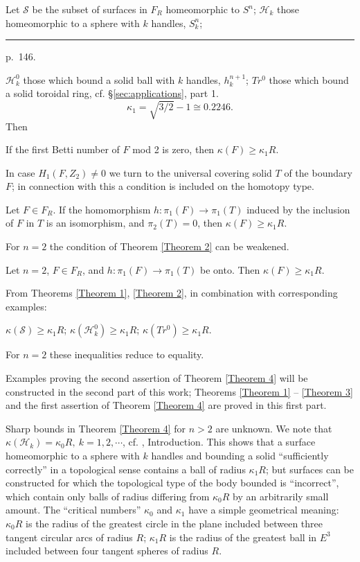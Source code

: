 \documentclass{amsart}
\theoremstyle{plain}
\theoremstyle{definition}
\begin{document}
Let $\mathcal{S}$ be the subset of surfaces in $F_R$ homeomorphic
to $S^n$; $\mathcal{H}_k$ those homeomorphic to a sphere with $k$
handles, $S^n_k$;

\medskip
\hrule\smallskip
\noindent p.~146.
\medskip

$\mathcal{H}^0_k$ those which bound a solid ball with $k$ handles,
$h^{n+1}_k$; $Tr^0$ those which bound a solid toroidal ring, cf.
\S \ref{sec:applications}, part 1.
$$\kappa_1 = \sqrt{3/2} -1 \cong 0.2246.$$
Then
\begin{thm} \label{Theorem 1} If the first Betti number of $F$ mod 2 is
zero, then $\kappa(F) \ge \kappa_1R$.
\end{thm}
In case $H_1(F,Z_2) \ne 0$ we turn to the universal covering
solid $T$ of the boundary $F$; in connection with this a condition
is included on the homotopy type.
\begin{thm}\label{Theorem 2} Let $F \in F_R$. If the homomorphism
$h: \pi_1(F) \to \pi_1(T)$ induced by the inclusion of $F$ in
$T$ is an isomorphism, and $\pi_2(T) = 0$, then $\kappa(F) \ge
\kappa_1R$.
\end{thm}
For $n=2$ the condition of Theorem \ref{Theorem 2} can be weakened.
\begin{thm}\label{Theorem 3} Let $n=2$, $F \in F_R$, and $h: \pi_1(F)
\to \pi_1(T)$ be onto. Then $\kappa(F) \ge \kappa_1R$.
\end{thm}
From Theorems \ref{Theorem 1}, \ref{Theorem 2}, in combination with corresponding examples:
\begin{thm}\label{Theorem 4} $\kappa(\mathcal{S}) \ge \kappa_1R$; $\kappa(\mathcal{H}^0_k)
\ge \kappa_1R$; $\kappa(Tr^0) \ge \kappa_1R$.

For $n=2$ these inequalities reduce to equality.
\end{thm}
Examples proving the second assertion of Theorem \ref{Theorem 4} will be
constructed in the second part of this work; Theorems \ref{Theorem 1} -- \ref{Theorem 3}
and the first assertion of Theorem \ref{Theorem 4} are proved in this first part.

Sharp bounds in Theorem \ref{Theorem 4} for $n>2$ are unknown. We note that
$\kappa(\mathcal{H}_k) = \kappa_0R, \ k=1,2,\cdots$, cf. \cite{L3},
Introduction. This shows that a surface homeomorphic to a
sphere with $k$ handles and bounding a solid ``sufficiently
correctly'' in a topological sense contains a ball of radius
$\kappa_1R$; but surfaces can be constructed for which the
topological type of the body bounded is ``incorrect'', which
contain only balls of radius differing from $\kappa_0R$ by an
arbitrarily small amount. The ``critical numbers'' $\kappa_0$
and $\kappa_1$ have a simple geometrical meaning: $\kappa_0R$
is the radius of the greatest circle in the plane included between
three tangent circular arcs of radius $R$; $\kappa_1R$ is the
radius of the greatest ball in $E^3$ included between four
tangent spheres of radius $R$.
\end{document}
